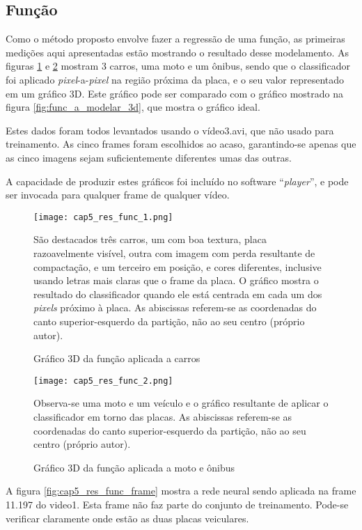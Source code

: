 \subsection{Função}

Como o método proposto envolve fazer a regressão de uma função, as primeiras
medições aqui apresentadas estão mostrando o resultado desse modelamento. As
figuras \ref{fig:cap5_res_func_1} e \ref{fig:cap5_res_func_2} mostram 3 carros,
uma moto e um ônibus, sendo que o classificador foi aplicado
\emph{pixel}-a-\emph{pixel} na
região próxima da placa, e o seu valor representado em um gráfico 3D. Este
gráfico pode ser comparado com o gráfico mostrado na figura
\ref{fig:func_a_modelar_3d}, que mostra o gráfico ideal.

Estes dados foram todos levantados usando o vídeo3.avi, que não usado para
treinamento. As cinco frames foram escolhidos ao acaso, garantindo-se apenas
que as cinco imagens sejam suficientemente diferentes umas das outras.

A capacidade de produzir estes gráficos foi incluído no software
``\emph{player}'', e pode ser invocada para qualquer frame de qualquer vídeo.

\begin{figure}[!htb]
	\centering
	\texttt{[image: cap5\_res\_func\_1.png]}
	\caption{Gráfico 3D da função aplicada a carros}
	\label{fig:cap5_res_func_1}
	São destacados três carros, um com boa textura, placa razoavelmente
	visível, outra com imagem com perda resultante de compactação, e um
	terceiro em posição, e cores diferentes, inclusive usando letras mais
	claras que o frame da placa. O gráfico mostra o resultado do classificador
	quando ele está centrada em cada um dos \emph{pixels} próximo à placa.
	As abiscissas referem-se as coordenadas do canto superior-esquerdo da
	partição, não ao seu centro (próprio autor).
\end{figure}

\begin{figure}[!htb]
	\centering
	\texttt{[image: cap5\_res\_func\_2.png]}
	\caption{Gráfico 3D da função aplicada a moto e ônibus}
	\label{fig:cap5_res_func_2}
	Observa-se uma moto e um veículo e o gráfico resultante de aplicar o
	classificador em torno das placas. As abiscissas referem-se as coordenadas
	do canto superior-esquerdo da partição, não ao seu centro (próprio autor).
\end{figure}

A figura \ref{fig:cap5_res_func_frame} mostra a rede neural sendo aplicada
na frame 11.197 do video1. Esta frame não faz parte do conjunto de treinamento.
Pode-se verificar claramente onde estão as duas placas veiculares.


